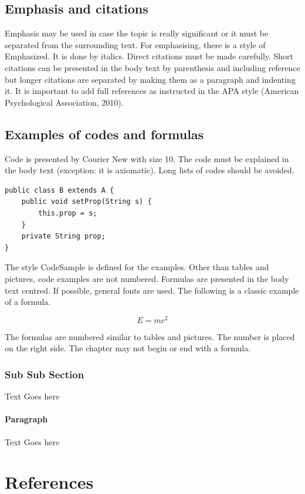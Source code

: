\documentclass[a4paper,12pt]{article}
\begin{document}
\subsection{Emphasis and citations}
Emphasis may be used in case the topic is really significant or it must be separated from the surrounding text. For emphasising, there is a style of Emphasized. It is done by italics.
Direct citations must be made carefully. Short citations can be presented in the body text by parenthesis and including reference but longer citations are separated by making them as a paragraph and indenting it. It is important to add full references as instructed in the APA style (American Psychological Association, 2010).

\subsection{Examples of codes and formulas}
Code is presented by Courier New with size 10. The code must be explained in the body text (exception: it is axiomatic). Long lists of codes should be avoided.

\begin{verbatim}
public class B extends A {	
    public void setProp(String s) {
        this.prop = s;
    }
    private String prop;
}
\end{verbatim}

The style CodeSample is defined for the examples. Other than tables and pictures, code examples are not numbered.
Formulas are presented in the body text centred. If possible, general fonts are used. The following is a classic example of a formula.

\begin{equation}
    E = mc^2
\end{equation}

The formulas are numbered similar to tables and pictures. The number is placed on the right side. The chapter may not begin or end with a formula.
\subsubsection{Sub Sub Section}
Text Goes here

\paragraph{Paragraph}
Text Goes here

\newpage
\section*{References}

\printbibliography[heading=none] %
\nocite{*}
\end{document}
